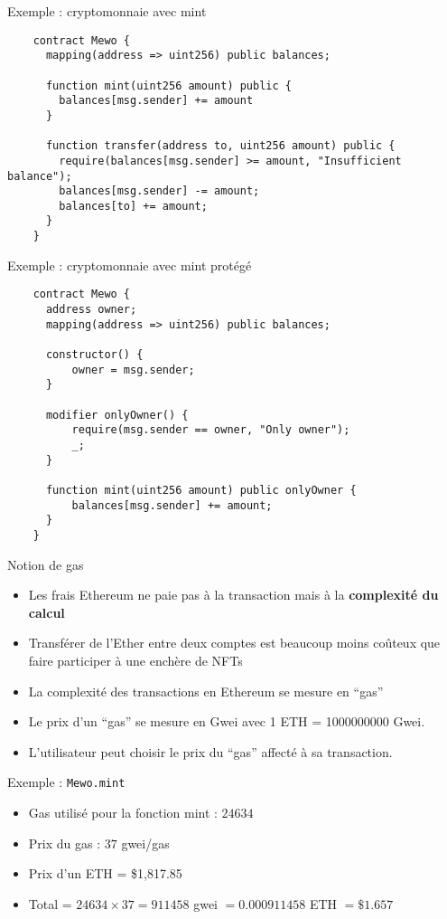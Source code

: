 \begin{frame}[fragile]{Exemple : cryptomonnaie avec mint}
  \begin{verbatim}
    contract Mewo {
      mapping(address => uint256) public balances;

      function mint(uint256 amount) public {
        balances[msg.sender] += amount
      }

      function transfer(address to, uint256 amount) public {
        require(balances[msg.sender] >= amount, "Insufficient balance");
        balances[msg.sender] -= amount;
        balances[to] += amount;
      }
    }
  \end{verbatim}
\end{frame}

\begin{frame}[fragile]{Exemple : cryptomonnaie avec mint protégé}
  \begin{verbatim}
    contract Mewo {
      address owner;
      mapping(address => uint256) public balances;

      constructor() {
          owner = msg.sender;
      }
    
      modifier onlyOwner() {
          require(msg.sender == owner, "Only owner");
          _;
      }
    
      function mint(uint256 amount) public onlyOwner {
          balances[msg.sender] += amount;
      }
    }
  \end{verbatim}
\end{frame}

\begin{frame}{Notion de gas}
  \begin{itemize}
    \item Les frais Ethereum ne paie pas à la transaction mais à la \textbf{complexité du calcul}
    \item Transférer de l'Ether entre deux comptes est beaucoup moins coûteux que faire participer à une enchère de NFTs
    \item La complexité des transactions en Ethereum se mesure en \enquote{gas}
    \item Le prix d'un \enquote{gas} se mesure en Gwei avec 1 ETH = 1000000000 Gwei.
    \item L'utilisateur peut choisir le prix du \enquote{gas} affecté à sa transaction.
  \end{itemize}

  \begin{block}{Exemple : \texttt{Mewo.mint}}
    \begin{itemize}
      \item Gas utilisé pour la fonction mint : $24634$
      \item Prix du gas : $37$ gwei/gas
      \item Prix d'un ETH = \$1,817.85
      \item Total = $24634\times37=911458$ gwei $= 0.000911458$ ETH $ = \$1.657$
    \end{itemize}
  \end{block}
\end{frame}
